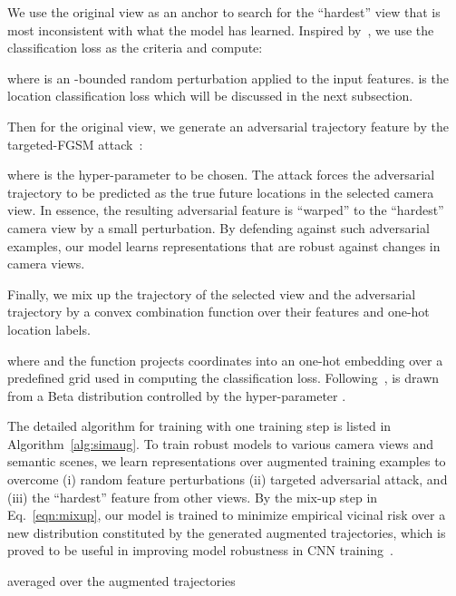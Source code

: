 \documentclass[runningheads]{eccv2020/llncs}
\newcommand{\fancyname}{SimAug}
\begin{document}
We use the original view as an anchor to search for the ``hardest'' view that is most inconsistent with what the model has learned. Inspired by~\cite{jiang2017mentornet}, we use the classification loss as the criteria and compute:

where  is an -bounded random perturbation applied to the input features.   is the location classification loss which will be discussed in the next subsection.

Then for the original view, we generate an adversarial trajectory feature by the targeted-FGSM attack~\cite{kurakin2016adversarial}:

where  is the hyper-parameter to be chosen. 
The attack forces the adversarial trajectory to be predicted as the true future locations in the selected camera view.
In essence, the resulting adversarial feature is ``warped'' to the ``hardest'' camera view by a small perturbation.
By defending against such adversarial examples, our model learns representations that are robust against changes in camera views.  

Finally, we mix up the trajectory of the selected view and the adversarial trajectory by a convex combination function over their features and one-hot location labels.

where  and the  function projects  coordinates into an one-hot embedding over a predefined grid used in computing the classification loss. Following~\cite{zhang2017mixup},  is drawn from a Beta distribution  controlled by the hyper-parameter .


The detailed algorithm for training with one training step is listed in Algorithm~\ref{alg:simaug}.
To train robust models to various camera views and semantic scenes, we learn representations over augmented training examples to overcome (i) random feature perturbations (ii) targeted adversarial attack, and (iii) the ``hardest'' feature from other views.
By the mix-up step in Eq.~\eqref{eqn:mixup}, 
our model is trained to minimize empirical vicinal risk over a new distribution constituted by the generated augmented trajectories, which is proved to be useful in improving model robustness in CNN training~\cite{zhang2017mixup}.



\vspace{-8mm}
\begin{algorithm}
\LinesNumbered
{}
\BlankLine
{}
\Return  averaged  over the augmented trajectories
\caption{\small Multi-view Simulation Adversarial Augmentation (\textit{\fancyname})}
\label{alg:simaug}
\end{algorithm}
\vspace{-8mm}
\end{document}
